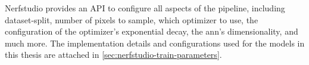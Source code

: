 Nerfstudio provides an API to configure all aspects of the pipeline, including dataset-split, number of pixels to sample, which optimizer to use, the configuration of the optimizer's exponential decay, the \acrshort{ann}'s dimensionality, and much more. The implementation details and configurations used for the models in this thesis are attached in \autoref{sec:nerfstudio-train-parameters}.



\begin{comment}
The experiments in this thesis focus on the faster NeRF models implemented in Nerfstudio, namely Nerfacto (\autoref{sec:nerfacto}) and Instant NGP (\autoref{sec:instant-ngp}). Although the models are different, most of the shared model configurations are the same as can be seen in the model parameters included in \autoref{sec:nerfstudio-train-parameters}.

During training, the parameters in the model are trained to represent the 3D scene. For the Nerfacto-model, this entails backpropagating the error and updating both the NeRF MLP and the proposal MLP. The Nerfacto- and Instant NGP-model leverage 3 different losses to guide the training; \textit{RGB loss}, \textit{interlevel loss} and \textit{distortion loss}. \textit{RGB loss} is the standard NeRF-loss explained in \autoref{eq:nerf-loss}. Interlevel- and distortion-loss are both from the Mip-NeRF 360 implementation explained in \autoref{sec:mipnerf360}. The interlevel loss encourages the model to generate consistent predictions across different levels of the multi-scale hierarchy, while the distortion loss encourages the model to generate smooth and continuous predictions.

The training leverages the ADAM optimizer \cite{adam} for all networks within the model. The optimizer for the proposal networks and Nerfacto fields both use a learning rate of $1 \times 10^{-2}$, with no weight decay and $\epsilon=10^{-8}$, while the camera optimizer uses a learning rate of $6 \times 10^{-4}$, weight decay of $1 \times 10^{-2}$, and $\epsilon=10^{-8}$. All scenes were trained for 15,000 iterations, which is sufficient for achieving convergence. Training time for each scene is approximately 15-20 minutes when using an NVIDIA A100 GPU.


\end{comment}
